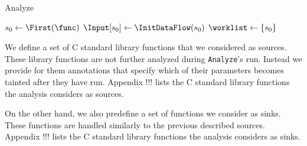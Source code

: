 \IncMargin{1em}
\begin{algorithm}
\caption{Analyze}\label{fig:algoAnalyze}
\SetAlgoLined
\LinesNumbered
\DontPrintSemicolon
{}


\OutData{}
$ s_0 \leftarrow \First(\func)$\;
$\Input[s_0] \leftarrow \InitDataFlow(s_0)$\;
$\worklist \leftarrow \set{s_0}$\;
\While{ $\worklist\ \neq\ \emptyset$ }{
	$\varI \leftarrow \Next(\worklist)$\;
	$\Output[i] \leftarrow \Flow(\AnalyzeAlgo, \varI)$\;
	\ForEach{ $\varJ \in \Succs(\varI)$ }{
		\If{ $\Output[\varI] \not\sqsubseteq \Input[\varJ]$}{
			$\Input[\varJ] \leftarrow \Input[\varJ] \sqcup \Output[\varI]$\;
			$\worklist \leftarrow \worklist \cup\ \set{\varJ}$\;
		}	
	}
}
\end{algorithm}
\DecMargin{1em}

We define a set of C standard library functions that
we considered as sources. These library functions are not
further analyzed during \texttt{Analyze}'s run.
Instead we provide for them annotations that specify
which of their parameters becomes tainted after they
have run. Appendix !!! lists the C standard library
functions the analysis considers as sources.

On the other hand, we also predefine a set of functions
we consider as sinks. These functions are handled similarly
to the previous described sources. Appendix !!! lists
the C standard library functions the analysis considers
as sinks.

